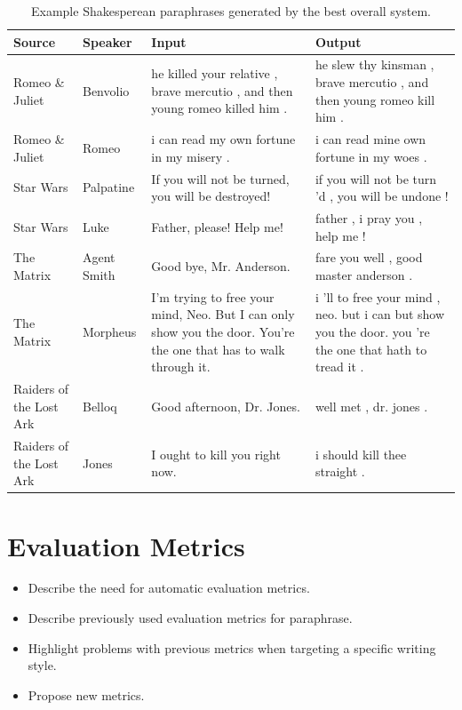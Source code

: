 \documentclass[10pt,a5paper,twoside]{article}
\begin{document}
\begin{table}
  \begin{center}
    \begin{tabular}{|l|l|p{1.4in}|p{1.4in}|}
      \hline
      Source & Speaker & Input & Output \\
      \hline
      \hline
      Romeo \& Juliet & Benvolio & he killed your relative , brave mercutio , and then young romeo killed him . & he slew thy kinsman , brave mercutio , and then young romeo kill him . \\
      \hline
      Romeo \& Juliet & Romeo & i can read my own fortune in my misery . & i can read mine own fortune in my woes . \\
      \hline
      Star Wars & Palpatine & If you will not be turned, you will be destroyed! & if you will not be turn 'd , you will be undone ! \\
      \hline
      Star Wars & Luke & Father, please! Help me! & father , i pray you , help me ! \\    
      \hline
      The Matrix & Agent Smith & Good bye, Mr. Anderson. & fare you well , good master anderson . \\
      \hline
      The Matrix & Morpheus & I'm trying to free your mind, Neo. But I can only show you the door. You're the one that has to walk through it. & i 'll to free your mind , neo. but i can but show you the door. you 're the one that hath to tread it . \\
      \hline
      Raiders of the Lost Ark & Belloq & Good afternoon, Dr. Jones. & well met , dr. jones . \\
      \hline
      Raiders of the Lost Ark & Jones & I ought to kill you right now. & i should kill thee straight . \\
      \hline
    \end{tabular}
  \end{center}
  \caption{Example Shakesperean paraphrases generated by the best overall system.}
\end{table}

\section{Evaluation Metrics}
\begin{itemize}
  \item Describe the need for automatic evaluation metrics.
  \item Describe previously used evaluation metrics for paraphrase.
  \item Highlight problems with previous metrics when targeting a specific writing style.
  \item Propose new metrics.
\end{itemize}
\end{document}
